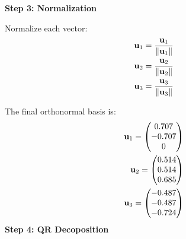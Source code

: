 \documentclass[11pt]{book}
\begin{document}
\begin{enumerate}
\textbf{Step 3: Normalization}

Normalize each vector:
\begin{align}
\mathbf{u}_1 = \frac{\mathbf{u}_1}{\left\lVert\mathbf{u}_1\right\rVert} \\
\mathbf{u}_2 = \frac{\mathbf{u}_2}{\left\lVert\mathbf{u}_2\right\rVert} \\
\mathbf{u}_3 = \frac{\mathbf{u}_3}{\left\lVert\mathbf{u}_3\right\rVert} 
\end{align}

The final orthonormal basis is:
\begin{align}
\mathbf{u}_1 = \begin{pmatrix}0.707\\-0.707\\0\end{pmatrix}\\
\mathbf{u}_2 = \begin{pmatrix}0.514\\0.514\\0.685\end{pmatrix}\\
\mathbf{u}_3 = \begin{pmatrix}-0.487\\-0.487\\-0.724\end{pmatrix}\\
\end{align}
\textbf{Step 4: QR Decoposition}


\end{enumerate}
\end{document}

